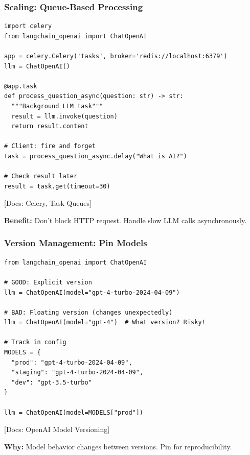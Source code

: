 \documentclass[aspectratio=169,11pt]{beamer}
\newcommand{\docref}[1]{{\scriptsize\color{docgray}[Docs: #1]}}
\begin{document}
\begin{frame}[fragile]
\frametitle{Scaling: Queue-Based Processing}

\begin{lstlisting}
import celery
from langchain_openai import ChatOpenAI

app = celery.Celery('tasks', broker='redis://localhost:6379')
llm = ChatOpenAI()

@app.task
def process_question_async(question: str) -> str:
  """Background LLM task"""
  result = llm.invoke(question)
  return result.content

# Client: fire and forget
task = process_question_async.delay("What is AI?")

# Check result later
result = task.get(timeout=30)
\end{lstlisting}

\docref{Celery, Task Queues}

\small\textbf{Benefit:} Don't block HTTP request. Handle slow LLM calls asynchronously.

\end{frame}

\begin{frame}[fragile]
\frametitle{Version Management: Pin Models}

\begin{lstlisting}
from langchain_openai import ChatOpenAI

# GOOD: Explicit version
llm = ChatOpenAI(model="gpt-4-turbo-2024-04-09")

# BAD: Floating version (changes unexpectedly)
llm = ChatOpenAI(model="gpt-4")  # What version? Risky!

# Track in config
MODELS = {
  "prod": "gpt-4-turbo-2024-04-09",
  "staging": "gpt-4-turbo-2024-04-09",
  "dev": "gpt-3.5-turbo"
}

llm = ChatOpenAI(model=MODELS["prod"])
\end{lstlisting}

\docref{OpenAI Model Versioning}

\small\textbf{Why:} Model behavior changes between versions. Pin for reproducibility.

\end{frame}
\end{document}
